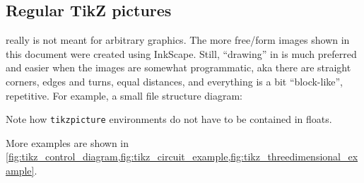 \subsection{Regular TikZ pictures}

 really is not meant for arbitrary graphics.
The more free\-/form images shown in this document were created using InkScape.
Still, \enquote{drawing} in  is much preferred and easier when the
images are somewhat programmatic, aka there are straight corners, edges and turns,
equal distances, and everything is a bit \enquote{block-like}, repetitive.
For example, a small file structure diagram:
\begin{center}
\end{center}
Note how \verb|tikzpicture| environments do not have to be contained in floats.

More  examples are shown in
\cref{fig:tikz_control_diagram,fig:tikz_circuit_example,fig:tikz_threedimensional_example}.

